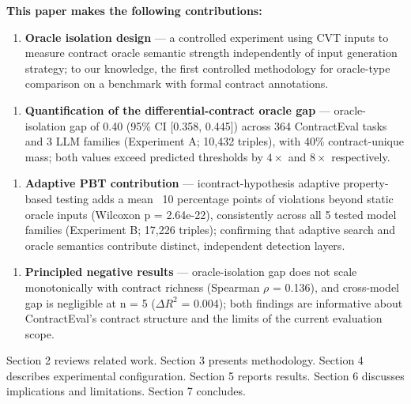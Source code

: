 \textbf{This paper makes the following contributions:}

\begin{enumerate}
\item \textbf{Oracle isolation design} --- a controlled experiment using CVT inputs to measure contract oracle semantic strength independently of input generation strategy; to our knowledge, the first controlled methodology for oracle-type comparison on a benchmark with formal contract annotations.
\end{enumerate}

\begin{enumerate}
\item \textbf{Quantification of the differential-contract oracle gap} --- oracle-isolation gap of 0.40 (95\% CI [0.358, 0.445]) across 364 ContractEval tasks and 3 LLM families (Experiment A; 10,432 triples), with 40\% contract-unique mass; both values exceed predicted thresholds by $4\times$ and $8\times$ respectively.
\end{enumerate}

\begin{enumerate}
\item \textbf{Adaptive PBT contribution} --- icontract-hypothesis adaptive property-based testing adds a mean ~10 percentage points of violations beyond static oracle inputs (Wilcoxon p = 2.64e-22), consistently across all 5 tested model families (Experiment B; 17,226 triples); confirming that adaptive search and oracle semantics contribute distinct, independent detection layers.
\end{enumerate}

\begin{enumerate}
\item \textbf{Principled negative results} --- oracle-isolation gap does not scale monotonically with contract richness (Spearman $\rho$ = 0.136), and cross-model gap is negligible at n = 5 ($\Delta R^2$ = 0.004); both findings are informative about ContractEval's contract structure and the limits of the current evaluation scope.
\end{enumerate}

Section 2 reviews related work. Section 3 presents methodology. Section 4 describes experimental configuration. Section 5 reports results. Section 6 discusses implications and limitations. Section 7 concludes.

